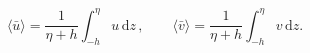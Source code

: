 \begin{equation}
	\langle\bar{u}\rangle = \frac{1}{\eta + h}\int_{-h}^{\eta}u \,\text{d}z \,,\qquad \langle\bar{v}\rangle = \frac{1}{\eta + h}\int_{-h}^{\eta}v \,\text{d}z.
\label{UVAv}
\end{equation}
